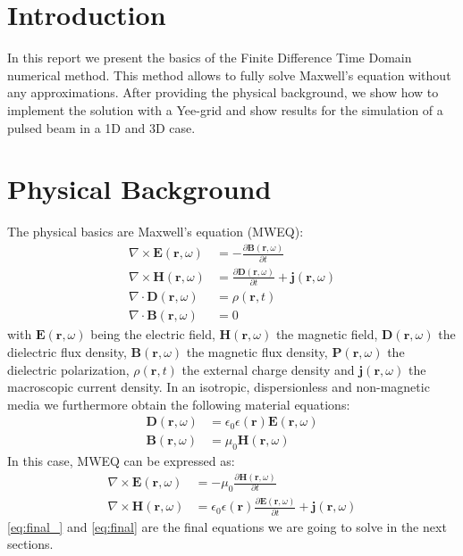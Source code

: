 \documentclass[a4paper,12pt]{scrartcl}
\title{\titel}
\author{\large{Martin \textsc{Aleksiev}, Felix \textsc{Wechsler}, Mei \textsc{Yunhao}, Mingxuan \textsc{Zhang}}\\  \large{Group 3}}
\date{\large{\today}}
\newcommand\ff[1]{ \mathbf #1(\mathbf r, \omega)}
\begin{document}
    \maketitle
	\thispagestyle{empty}
	\newpage
	\setcounter{page}{1}
	\tableofcontents

\newpage
\section{Introduction}
    In this report we present the basics of the Finite Difference Time Domain numerical method.
    This method allows to fully solve Maxwell's equation without any approximations.
    After providing the physical background, we show how to implement the solution with 
    a Yee-grid and show results for the simulation of a pulsed beam in a 1D and 3D case.

\section{Physical Background}
   The physical basics are Maxwell's equation (MWEQ):
   \begin{align}
       \nabla \times \ff{E} &= - \frac{\partial \ff B} {\partial t}\\
        \nabla \times \ff{H} &=  \frac{\partial \ff D} {\partial t} + \ff j \\
        \nabla \cdot \ff D &= \rho(\mathbf r , t)\\
        \nabla \cdot \ff B &= 0
   \end{align}
   with $\ff E$ being the electric field, $\ff H$ the magnetic field, $\ff D $ the dielectric flux density,
   $\ff B$ the magnetic flux density, $\ff P$ the dielectric polarization, $\rho (\mathbf{r}, t)$ the external charge density and
   $\ff j$ the macroscopic current density.
   In an isotropic, dispersionless and non-magnetic media we furthermore obtain the following material equations:
   \begin{align}
       \ff D &= \epsilon_0 \epsilon(\mathbf r) \ff E\\
       \ff B &= \mu_0 \ff H
   \end{align}
   In this case, MWEQ can be expressed as:
    \begin{align}
        \nabla \times \ff{E} &= - \mu_0 \frac{\partial \ff H} {\partial t}
        \label{eq:final_}\\
        \nabla \times \ff{H} &=  \epsilon_0 \epsilon(\mathbf r) \frac{\partial \ff E} {\partial t} + \ff j 
        \label{eq:final}
    \end{align}
   \ref{eq:final_} and \ref{eq:final} are the final equations we are going to solve in the next sections.
   
\end{document}
